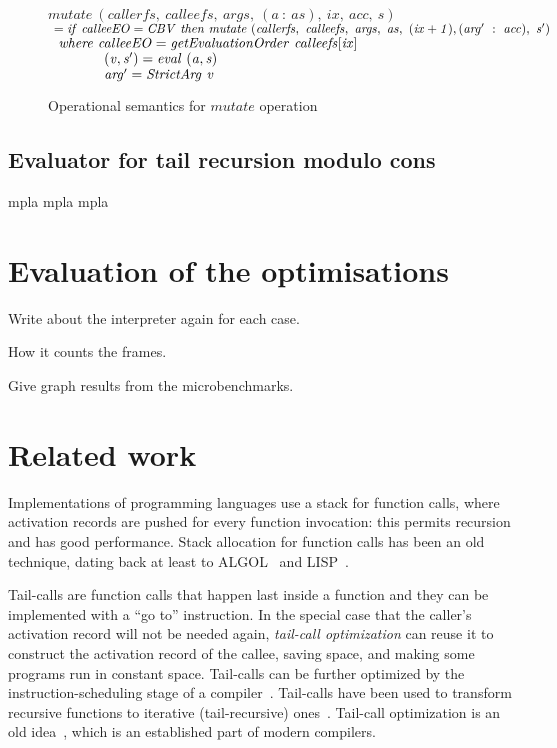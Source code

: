 \documentclass[diploma]{softlab-thesis}
\begin{document}
\begin{figure}[h]
  $\mathit{mutate~(callerfs,~calleefs,~args,~(a~:~as),~ix,~acc,~s)}$ \\ 
  $\mathit{\hfill\ =if~calleeEO=CBV~then~mutate~(callerfs,~calleefs,~args,~as,~(ix+1),(arg'~:~acc), ~s')}$ \\
  $\mathit{\hfill\ \hfill\ where~calleeEO=getEvaluationOrder~calleefs[ix]}$ \\  
  $\mathit{\hfill\ \hfill\ \hfill\ \hfill\ \hfill\ \hfill\ \hfill\ \hfill\ \hfill\ \hfill\ \hfill\ \hfill\ 
            (v, s') = eval~(a, s)}$ \\
  $\mathit{\hfill\ \hfill\ \hfill\ \hfill\ \hfill\ \hfill\ \hfill\ \hfill\ \hfill\ \hfill\ \hfill\ \hfill\ 
            arg'=StrictArg~v}$ \\
\caption{Operational semantics for $\mathit{mutate}$ operation\label{fig:mutate}}
\end{figure}

\section {Evaluator for tail recursion modulo cons}
\label{sec:tco-modulo-cons-eval}

mpla mpla mpla 

\chapter {Evaluation of the optimisations}
\label{ch:evaluation}

Write about the interpreter again for each case.

How it counts the frames. 

Give graph results from the microbenchmarks.

\chapter{Related work}
\label{ch:related}

Implementations of programming languages use a stack for function calls, 
where activation records are pushed for every function invocation: this permits recursion 
and has good performance. Stack allocation for function calls has been an old technique, 
dating back at least to ALGOL~\cite{Dijkstra60,Naur78} and LISP~\cite{McCarthy60,Stoyan79}.

Tail-calls are function calls that happen last inside a function and
they can be implemented with a ``go to'' instruction. In the special
case that the caller's activation record will not be needed again,
\emph{tail-call optimization} can reuse it to construct the activation
record of the callee, saving space, and making some programs run in
constant space. Tail-calls can be further optimized by the
instruction-scheduling stage of a compiler~\cite[\S12.4.3]{Torczon12}.
Tail-calls have been used to transform recursive functions to
iterative (tail-recursive)
ones~\cite[\S{9}]{McCarthy62}\cite{Barron68}.  Tail-call optimization
is an old idea~\cite[p.~7]{Gill65}\cite[p.~21]{Knuth74}, which is an
established part of modern compilers.
\end{document}
